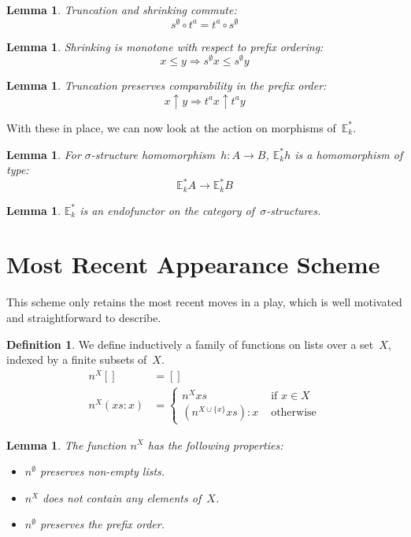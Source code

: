 \documentclass{article}
\theoremstyle{plain}
\newtheorem{lemma}[theorem]{Lemma}
\theoremstyle{definition}
\newtheorem{definition}[theorem]{Definition}
\theoremstyle{remark}
\numberwithin{theorem}{section}
\begin{document}
\begin{lemma}
Truncation and shrinking commute:
\begin{equation*}
    s^\emptyset \circ t^a = t^a \circ s^\emptyset
\end{equation*}
\end{lemma}
\begin{lemma}
Shrinking is monotone with respect to prefix ordering:
\begin{equation*}
    x \leq y \Rightarrow s^\emptyset x \leq s^\emptyset y
\end{equation*}
\end{lemma}
\begin{lemma}
Truncation preserves comparability in the prefix order:
\begin{equation*}
    x \uparrow y \Rightarrow t^a x \uparrow t^a y
\end{equation*}
\end{lemma}
With these in place, we can now look at the action on morphisms of~$\mathbb{E}^*_k$.
\begin{lemma}
For $\sigma$-structure homomorphism~$h : A \rightarrow B$, $\mathbb{E}^*_k h$ is a homomorphism of type:
\begin{equation*}
    \mathbb{E}^*_k A \rightarrow \mathbb{E}^*_k B
\end{equation*}
\end{lemma}
\begin{lemma}
$\mathbb{E}^*_k$ is an endofunctor on the category of~$\sigma$-structures.
\end{lemma}

\section{Most Recent Appearance Scheme}
This scheme only retains the most recent moves in a play, which is well motivated and straightforward to describe.
\begin{definition}
We define inductively a family of functions on lists over a set~$X$, indexed by a finite subsets of~$X$.
\begin{align*}
    n^X [] &= []\\
    n^X (xs:x) &= 
    \begin{cases}
    n^X xs &\mbox{ if } x \in X\\
    (n^{X \cup \{ x \} }xs) : x &\mbox{ otherwise}
    \end{cases}
\end{align*}
\end{definition}
\begin{lemma}
The function $n^X$ has the following properties:
\begin{itemize}
    \item $n^\emptyset$ preserves non-empty lists.
    \item $n^X$ does not contain any elements of~$X$.
    \item $n^\emptyset$ preserves the prefix order.
\end{itemize}
\end{lemma}
\end{document}
